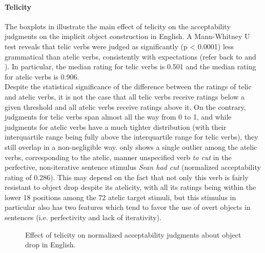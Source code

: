 \paragraph{Telicity}
The boxplots in  illustrate the main effect of telicity on the acceptability judgments on the implicit object construction in English. A Mann-Whitney U test reveals that telic verbs were judged as significantly (p < 0.0001) less grammatical than atelic verbs, consistently with expectations (refer back to  and ). In particular, the median rating for telic verbs is 0.501 and the median rating for atelic verbs is 0.906.\\
Despite the statistical significance of the difference between the ratings of telic and atelic verbs, it is not the case that all telic verbs receive ratings below a given threshold and all atelic verbs receive ratings above it. On the contrary, judgments for telic verbs span almost all the way from 0 to 1, and while judgments for atelic verbs have a much tighter distribution (with their interquartile range being fully above the interquartile range for telic verbs), they still overlap in a non-negligible way.
 only shows a single outlier among the atelic verbs, corresponding to the atelic, manner unspecified verb \textit{to cut} in the perfective, non-iterative sentence stimulus \textit{Sean had cut} (normalized acceptability rating of 0.286). This may depend on the fact that not only this verb is fairly resistant to object drop despite its atelicity, with all its ratings being within the lower 18 positions among the 72 atelic target stimuli, but this stimulus in particular also has two features which tend to favor the use of overt objects in sentences (i.e. perfectivity and lack of iterativity).

\begin{figure}[htb]
\caption{Effect of telicity on normalized acceptability judgments about object drop in English.}
    
\end{figure}


